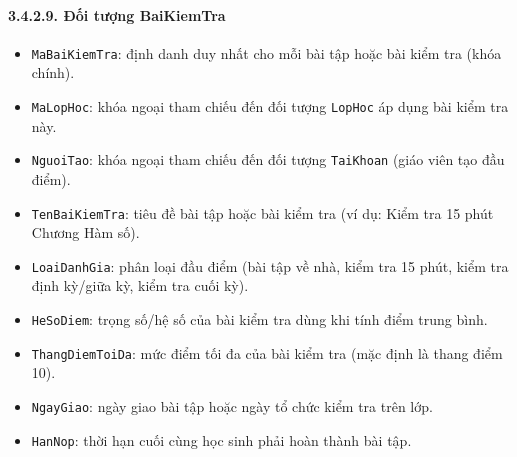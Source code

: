 \documentclass[12pt,a4paper]{article}
\begin{document}
\paragraph{3.4.2.9. Đối tượng BaiKiemTra}\mbox{}
\begin{itemize}\setlength{\itemsep}{2pt}\setlength{\parskip}{0pt}
    \item \texttt{MaBaiKiemTra}: định danh duy nhất cho mỗi bài tập hoặc bài kiểm tra (khóa chính).
    \item \texttt{MaLopHoc}: khóa ngoại tham chiếu đến đối tượng \texttt{LopHoc} áp dụng bài kiểm tra này.
    \item \texttt{NguoiTao}: khóa ngoại tham chiếu đến đối tượng \texttt{TaiKhoan} (giáo viên tạo đầu điểm).
    \item \texttt{TenBaiKiemTra}: tiêu đề bài tập hoặc bài kiểm tra (ví dụ: Kiểm tra 15 phút Chương Hàm số).
    \item \texttt{LoaiDanhGia}: phân loại đầu điểm (bài tập về nhà, kiểm tra 15 phút, kiểm tra định kỳ/giữa kỳ, kiểm tra cuối kỳ).
    \item \texttt{HeSoDiem}: trọng số/hệ số của bài kiểm tra dùng khi tính điểm trung bình.
    \item \texttt{ThangDiemToiDa}: mức điểm tối đa của bài kiểm tra (mặc định là thang điểm 10).
    \item \texttt{NgayGiao}: ngày giao bài tập hoặc ngày tổ chức kiểm tra trên lớp.
    \item \texttt{HanNop}: thời hạn cuối cùng học sinh phải hoàn thành bài tập.
\end{itemize}
\end{document}

